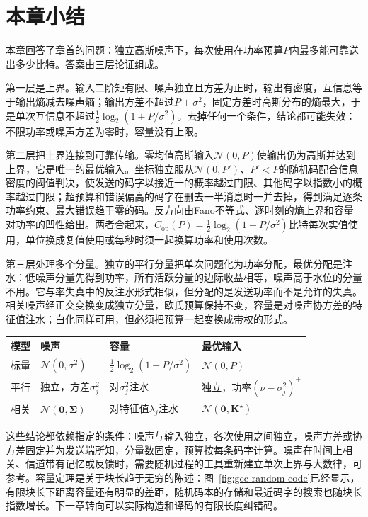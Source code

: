 \section{本章小结}
\label{sec:gcc-summary}

本章回答了章首的问题：独立高斯噪声下，每次使用在功率预算$P$内最多能可靠送出多少比特。答案由三层论证组成。

第一层是上界。输入二阶矩有限、噪声独立且方差为正时，输出有密度，互信息等于输出熵减去噪声熵；输出方差不超过$P+\sigma^2$，固定方差时高斯分布的熵最大，于是单次互信息不超过$\frac12\log_2(1+P/\sigma^2)$。去掉任何一个条件，结论都可能失效：不限功率或噪声方差为零时，容量没有上限。

第二层把上界连接到可靠传输。零均值高斯输入$\mathcal{N}(0,P)$使输出仍为高斯并达到上界，它是唯一的最优输入。坐标独立服从$\mathcal{N}(0,P')$、$P'<P$的随机码配合信息密度的阈值判决，使发送的码字以接近一的概率越过门限、其他码字以指数小的概率越过门限；超预算和错误偏高的码字在删去一半消息时一并去掉，得到满足逐条功率约束、最大错误趋于零的码。反方向由Fano不等式、逐时刻的熵上界和容量对功率的凹性给出。两者合起来，$C_{\mathrm{op}}(P)=\frac12\log_2(1+P/\sigma^2)$比特每次实值使用，单位换成复值使用或每秒时须一起换算功率和使用次数。

第三层处理多个分量。独立的平行分量把单次问题化为功率分配，最优分配是注水：低噪声分量先得到功率，所有活跃分量的边际收益相等，噪声高于水位的分量不用。它与率失真中的反注水形式相似，但分配的是发送功率而不是允许的失真。相关噪声经正交变换变成独立分量，欧氏预算保持不变，容量是对噪声协方差的特征值注水；白化同样可用，但必须把预算一起变换成带权的形式。

\begin{BookInlineTable}
 \centering
 \caption{本章的三种高斯信道}
 \label{tab:gcc-summary}
 \begin{tabular}{llll}
  \toprule
  模型 & 噪声 & 容量 & 最优输入 \\
  \midrule
  标量 & $\mathcal{N}(0,\sigma^2)$ & $\frac12\log_2(1+P/\sigma^2)$ & $\mathcal{N}(0,P)$ \\
  平行 & 独立，方差$\sigma_j^2$ & 对$\sigma_j^2$注水 & 独立，功率$(\nu-\sigma_j^2)^{+}$ \\
  相关 & $\mathcal{N}(\bm{0},\bm{\Sigma})$ & 对特征值$\lambda_j$注水 & $\mathcal{N}(\bm{0},\bm{K}^{\star})$ \\
  \bottomrule
 \end{tabular}
\end{BookInlineTable}

这些结论都依赖指定的条件：噪声与输入独立，各次使用之间独立，噪声方差或协方差固定并为发送端所知，分量数固定，预算按每条码字计算。噪声在时间上相关、信道带有记忆或反馈时，需要随机过程的工具重新建立单次上界与大数律，可参考。容量定理是关于块长趋于无穷的陈述：图~\ref{fig:gcc-random-code}已经显示，有限块长下距离容量还有明显的差距，随机码本的存储和最近码字的搜索也随块长指数增长。下一章转向可以实际构造和译码的有限长度纠错码。
